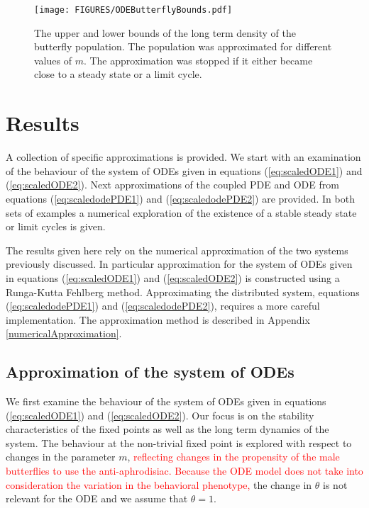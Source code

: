 \documentclass[review]{elsarticle}
\begin{document}
\begin{figure}[htb]
  \centering
  \texttt{[image: FIGURES/ODEButterflyBounds.pdf]}
  \caption[Upper and lower bounds of the butterfly density.]{The upper
    and lower bounds of the long term density of the butterfly
    population. The population was approximated for different values
    of $m$. The approximation was stopped if it either became close to
    a steady state or a limit cycle.}
  \label{fig:odeButterflyBifurcation}
\end{figure}




\section{Results}
\label{section:results}

A collection of specific approximations is provided. We start with an
examination of the behaviour of the system of ODEs given in equations
(\ref{eq:scaledODE1}) and (\ref{eq:scaledODE2}). Next approximations
of the coupled PDE and ODE from equations (\ref{eq:scaledodePDE1}) and
(\ref{eq:scaledodePDE2}) are provided. In both sets of examples a
numerical exploration of the existence of a stable steady state or
limit cycles is given.

The results given here rely on the numerical approximation of the two
systems previously discussed. In particular approximation for the
system of ODEs given in equations (\ref{eq:scaledODE1}) and
(\ref{eq:scaledODE2}) is constructed using a Runga-Kutta Fehlberg
method. Approximating the distributed system, equations
(\ref{eq:scaledodePDE1}) and (\ref{eq:scaledodePDE2}), requires a more
careful implementation. The approximation method is described in
Appendix \ref{numericalApproximation}.

\subsection{Approximation of the system of ODEs}
\label{subsection:odeApproximation}

We first examine the behaviour of the system of ODEs given in
equations (\ref{eq:scaledODE1}) and (\ref{eq:scaledODE2}). Our focus
is on the stability characteristics of the fixed points as well as the
long term dynamics of the system. The behaviour at the non-trivial
fixed point is explored with respect to changes in the parameter
$m$, \textcolor{red}{reflecting changes in the propensity of the male butterflies to use the anti-aphrodisiac. }\textcolor{red}{Because the ODE model does not take into consideration the variation in the behavioral phenotype,} the change in $\theta$ is not relevant for the ODE and we 
assume that $\theta=1$.
\end{document}
